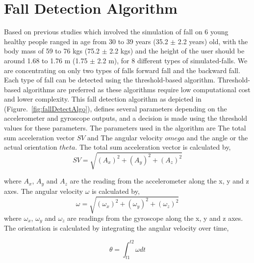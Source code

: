 \documentclass[conference]{IEEEtran}
\begin{document}
\section{Fall Detection Algorithm}
 Based on previous studies \cite{b9} which involved the simulation of fall on 6 young healthy people ranged in age from 30 to 39 years (35.2 $\pm$ 2.2 years) old, with the body mass of 59 to 76 kgs (75.2 $\pm$ 2.2 kgs) and the height of the user should be around 1.68 to 1.76 m (1.75 $\pm$ 2.2 m), for 8 different types of simulated-falls. We are concentrating on only two types of falls forward fall and the backward fall. Each type of fall can be detected using the threshold-based algorithm. Threshold-based algorithms are preferred as these algorithms require low computational cost and lower complexity. This fall detection algorithm as depicted in (Figure.~\ref{fig:fallDetectAlgo}), defines several parameters depending on the accelerometer and gyroscope outputs, and a decision is made using the threshold values for these parameters. The parameters used in the algorithm are The total sum acceleration vector \(SV\) and The angular velocity \(omega\) and the angle or the actual orientation \(theta\). The total sum acceleration vector is calculated by,
\begin{equation}
 SV = \sqrt{(A_x)^2 + (A_y)^2 + (A_z)^2}\label{eq:1}
 \end{equation}
 
where \(A_x\), \(A_y\) and \(A_z\) are the reading from the accelerometer along the x, y and z axes. The angular velocity \(\omega\) is calculated by, 
\begin{equation}
\omega = \sqrt{(\omega_x)^2 + (\omega_y)^2 + (\omega_z)^2}\label{eq:2}
\end{equation}
where \(\omega_x\), \(\omega_y\) and \(\omega_z\) are readings from the gyroscope along the x, y and z axes.\\
The  orientation is calculated by integrating the angular velocity over time,

\begin{equation}
\theta = \int_{t1}^{t2} \omega dt\label{eq:3}
\end{equation}
\end{document}
